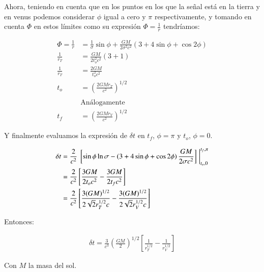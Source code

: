 Ahora, teniendo en cuenta que en los puntos en los que la señal está en la tierra y en venus podemos considerar $\phi$ igual a cero y $\pi$ respectivamente, y tomando en cuenta $\Phi$ en estos límites como su expresión $\Phi=\frac{1}{r}$ tendríamos:

\begin{align*}
    \Phi = \frac{1}{r} &= \frac{1}{\sigma} \sin\phi+\frac{GM}{2\sigma^2c^2}\left(3+4\sin\phi+\cos2\phi\right)\\
    \frac{1}{r_T} &=\frac{GM}{2t_o^2c^2}\left(3+1\right)\\
    \frac{1}{r_T} &=\frac{2GM}{t_o^2c^2}\\
    t_o&=\left(\frac{2GMr_T}{c^2}\right)^{1/2}\\\\
    &\text{Análogamente}\\
    t_f&=\left(\frac{2GMr_V}{c^2}\right)^{1/2}
\end{align*}


Y finalmente evaluamos la expresión de $\delta t$ en $t_f$, $\phi = \pi$ y $t_o$, $\phi = 0$.

\begin{align*}
    \delta t &= \frac{2}{c^2} ~\left[\sin\phi \ln\sigma-\left(3+4\sin\phi+\cos2\phi\right)\frac{GM}{2\sigma c^2}\right]\eval_{t_o,0}^{t_f,\pi}\\
        &=\frac{2}{c^2}\left[\frac{3GM}{2t_oc^2}-\frac{3GM}{2t_fc^2}\right]\\
        &=\frac{2}{c^2}\left[\frac{3(GM)^{1/2}}{2\sqrt{2}r_T^{1/2}c}-\frac{3(GM)^{1/2}}{2\sqrt{2}r_V^{1/2}c}\right]
\end{align*}


Entonces:

\begin{align*}
    \delta t = \frac{3}{c^3}\left(\frac{GM}{2}\right)^{1/2}\left[\frac{1}{r_T^{1/2}}-\frac{1}{r_V^{1/2}}\right]
\end{align*}

Con $M$ la masa del sol.